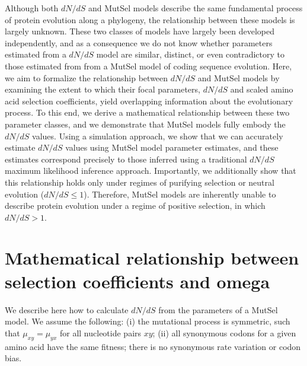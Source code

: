 \documentclass[11pt]{article}
\begin{document}
Although both $dN/dS$ and MutSel models describe the same fundamental process of protein evolution along a phylogeny, the relationship between these models is largely unknown. These two classes of models have largely been developed independently, and as a consequence we do not know whether parameters estimated from a $dN/dS$ model are similar, distinct, or even contradictory to those estimated from from a MutSel model of coding sequence evolution. Here, we aim to formalize the relationship between $dN/dS$ and MutSel models by examining the extent to which their focal parameters, $dN/dS$ and scaled amino acid selection coefficients, yield overlapping information about the evolutionary process. To this end, we derive a mathematical relationship between these two parameter classes, and we demonstrate that MutSel models fully embody the $dN/dS$ values. Using a simulation approach, we show that we can accurately estimate $dN/dS$ values using MutSel model parameter estimates, and these estimates correspond precisely to those inferred using a traditional $dN/dS$ maximum likelihood inference approach.  Importantly, we additionally show that this relationship holds only under regimes of purifying selection or neutral evolution ($dN/dS \leq 1$). Therefore, MutSel models are inherently unable to describe protein evolution under a regime of positive selection, in which $dN/dS > 1$. 
 
\section*{Mathematical relationship between selection coefficients and omega}
	
We describe here how to calculate $dN/dS$ from the parameters of a MutSel model. We assume the following: (i) the mutational process is symmetric, such that $\mu_{xy}=\mu_{yx}$ for all nucleotide pairs $xy$; (ii) all synonymous codons for a given amino acid have the same fitness; there is no synonymous rate variation or codon bias.
\end{document}

